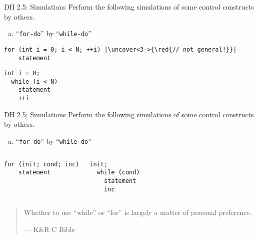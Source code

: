
\begin{frame}{}
\end{frame}

\begin{frame}[fragile]{}
  \begin{exampleblock}{DH 2.5: Simulations}
    Perform the following simulations of some control constructs by others.
    \begin{enumerate}[(a)]
      \item ``\texttt{for-do}'' by ``\texttt{while-do}''
    \end{enumerate}
  \end{exampleblock}

  \vspace{0.40cm}
  \pause
  \begin{lstlisting}[style = Cstyle, backgroundcolor = \color{teal!10!lightgray}]
  for (int i = 0; i < N; ++i) |\uncover<3->{\red{// not general!}}|
    statement
  \end{lstlisting}

  \vspace{0.20cm}
  \begin{lstlisting}[style = Cstyle]
  int i = 0;
  while (i < N)
    statement
    ++i
  \end{lstlisting}
\end{frame}
\begin{frame}[fragile]{}
  \begin{exampleblock}{DH 2.5: Simulations}
    Perform the following simulations of some control constructs by others.
    \begin{enumerate}[(a)]
      \item ``\texttt{for-do}'' by ``\texttt{while-do}''
    \end{enumerate}
  \end{exampleblock}

  \begin{columns}
      \begin{lstlisting}[style = Cstyle, backgroundcolor = \color{teal!10!lightgray}]
  for (init; cond; inc)
    statement
      \end{lstlisting}
      \begin{lstlisting}[style = Cstyle]
  init;
  while (cond)
    statement
    inc
      \end{lstlisting}
  \end{columns}

  \vspace{0.50cm}
  \pause
  \begin{quote}
    Whether to use ``while'' or ``for'' is largely a matter of personal preference.
     
    \hfill --- K\&R C Bible
  \end{quote}
\end{frame}

